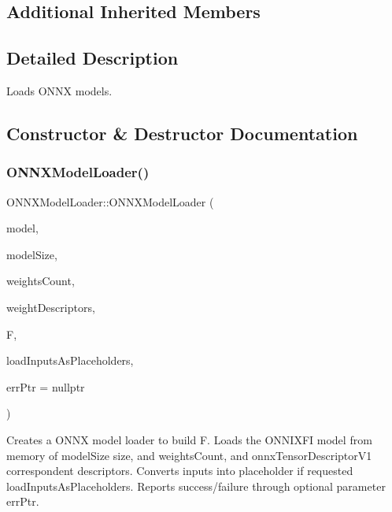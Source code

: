 \subsection*{Additional Inherited Members}


\subsection{Detailed Description}
Loads O\+N\+NX models. 

\subsection{Constructor \& Destructor Documentation}
\mbox{\label{classglow_1_1_o_n_n_x_model_loader_a4f342be604ca0d6c9371696e2b0f99bb}} 
\subsubsection{\texorpdfstring{O\+N\+N\+X\+Model\+Loader()}{ONNXModelLoader()}\hspace{0.1cm}{\footnotesize\ttfamily [1/3]}}
{\footnotesize\ttfamily O\+N\+N\+X\+Model\+Loader\+::\+O\+N\+N\+X\+Model\+Loader (\begin{DoxyParamCaption}\item[{const void $\ast$}]{model,  }\item[{uint32\+\_\+t}]{model\+Size,  }\item[{uint32\+\_\+t}]{weights\+Count,  }\item[{const onnx\+Tensor\+Descriptor\+V1 $\ast$}]{weight\+Descriptors,  }\item[{\hyperlink{classglow_1_1_function}{Function} \&}]{F,  }\item[{bool}]{load\+Inputs\+As\+Placeholders,  }\item[{\hyperlink{namespaceglow_afdb176c3a672ef66db0ecfc19a8d39bf}{Error} $\ast$}]{err\+Ptr = {\ttfamily nullptr} }\end{DoxyParamCaption})\hspace{0.3cm}{\ttfamily [protected]}}

Creates a O\+N\+NX model loader to build {\ttfamily F}. Loads the O\+N\+N\+I\+X\+FI {\ttfamily model} from memory of {\ttfamily model\+Size} size, and {\ttfamily weights\+Count}, and {\ttfamily onnx\+Tensor\+Descriptor\+V1} correspondent descriptors. Converts inputs into placeholder if requested {\ttfamily load\+Inputs\+As\+Placeholders}. Reports success/failure through optional parameter {\ttfamily err\+Ptr}. \mbox{\label{classglow_1_1_o_n_n_x_model_loader_ac83cee4acc760b654ff5df058476d0a7}} 
